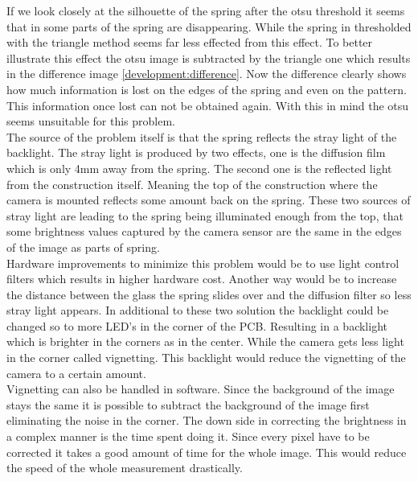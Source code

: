 If we look closely at the silhouette of the spring after the otsu threshold it seems that in some parts of the spring are disappearing. While the spring in thresholded with the triangle method seems far less effected from this effect. To better illustrate this effect the otsu image is subtracted by the triangle one which results in the difference image \ref{development:difference}.  
Now the difference clearly shows how much information is lost on the edges of the spring and even on the pattern. This information once lost can not be obtained again. With this in mind the otsu seems unsuitable for this problem. \\
The source of the problem itself is that the spring reflects the stray light of the backlight. The stray light is produced by two effects, one is the diffusion film which is only 4mm away from the spring. The second one is the reflected light from the construction itself. Meaning the top of the construction where the camera is mounted reflects some amount back on the spring. These two sources of stray light are leading to the spring being illuminated enough from the top, that some brightness values captured by the camera sensor are the same in the edges of the image as parts of spring.\\
Hardware improvements to minimize this problem would be to use light control filters which results in higher hardware cost. Another way would be to increase the distance between the glass the spring slides over and the diffusion filter so less stray light appears. In additional to these two solution the backlight could be changed so to more LED's in the corner of the PCB. Resulting in a backlight which is brighter in the corners as in the center. While the camera gets less light in the corner called vignetting. This backlight would reduce the vignetting of the camera to a certain amount. \\
Vignetting can also be handled in software. Since the background of the image stays the same it is possible to subtract the background of the image first eliminating the noise in the corner. The down side in correcting the brightness in a complex manner is the time spent doing it. Since every pixel have to be corrected it takes a good amount of time for the whole image. This would reduce the speed of the whole measurement drastically. \\

